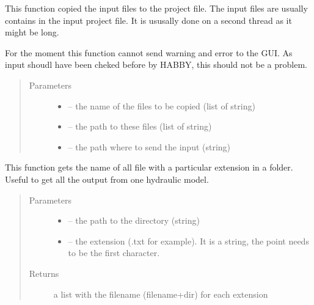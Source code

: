 \documentclass[letterpaper,10pt,english]{sphinxmanual}
\begin{document}
\begin{fulllineitems}
\label{\detokenize{index:src.load_hdf5.copy_files}}
This function copied the input files to the project file. The input files are usually contains in the input
project file. It is ususally done on a second thread as it might be long.

For the moment this function cannot send warning and error to the GUI. As input shoudl have been cheked before
by HABBY, this should not be a problem.
\begin{quote}\begin{description}
\item[{Parameters}] \leavevmode\begin{itemize}
\item {} 
 -- the name of the files to be copied (list of string)

\item {} 
 -- the path to these files (list of string)

\item {} 
 -- the path where to send the input (string)

\end{itemize}

\end{description}\end{quote}

\end{fulllineitems}


\begin{fulllineitems}
\label{\detokenize{index:src.load_hdf5.get_all_filename}}
This function gets the name of all file with a particular extension in a folder. Useful to get all the output
from one hydraulic model.
\begin{quote}\begin{description}
\item[{Parameters}] \leavevmode\begin{itemize}
\item {} 
 -- the path to the directory (string)

\item {} 
 -- the extension (.txt for example). It is a string, the point needs to be the first character.

\end{itemize}

\item[{Returns}] \leavevmode
a list with the filename (filename+dir) for each extension

\end{description}\end{quote}

\end{fulllineitems}
\end{document}
